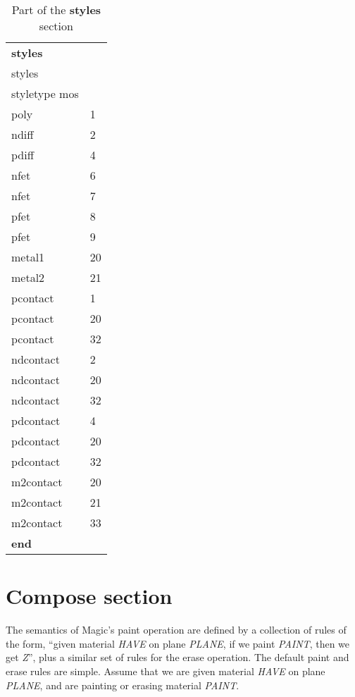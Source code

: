 \documentclass[letterpaper,twoside,12pt]{article}
\begin{document}
\begin{table}[ht]
   \begin{center}
      \begin{tabular}{|ll|} \hline
	{\bfseries styles} & \\
	styles & \\
	styletype mos & \\
	poly		& 1 \\
	ndiff		& 2 \\
	pdiff		& 4 \\
	nfet		& 6 \\
	nfet		& 7 \\
	pfet		& 8 \\
	pfet		& 9 \\
	metal1		& 20 \\
	metal2		& 21 \\
	pcontact	& 1 \\
	pcontact	& 20 \\
	pcontact	& 32 \\
	ndcontact	& 2 \\
	ndcontact	& 20 \\
	ndcontact	& 32 \\
	pdcontact	& 4 \\
	pdcontact	& 20 \\
	pdcontact	& 32 \\
	m2contact	& 20 \\
	m2contact	& 21 \\
	m2contact	& 33 \\
	{\bfseries end} & \\ \hline
      \end{tabular}
      \caption{Part of the {\bfseries styles} section}
      \label{styles}
   \end{center}
\end{table}

\section{Compose section}

The semantics of Magic's paint operation are defined by a collection
of rules of the form, ``given material {\itshape HAVE} on plane {\itshape PLANE},
if we paint {\itshape PAINT}, then
we get {\itshape Z}'', plus a similar set of rules for the erase operation.
The default paint and erase rules are simple.  Assume that we
are given material {\itshape HAVE} on plane {\itshape PLANE}, and are painting
or erasing material {\itshape PAINT}.
\end{document}
